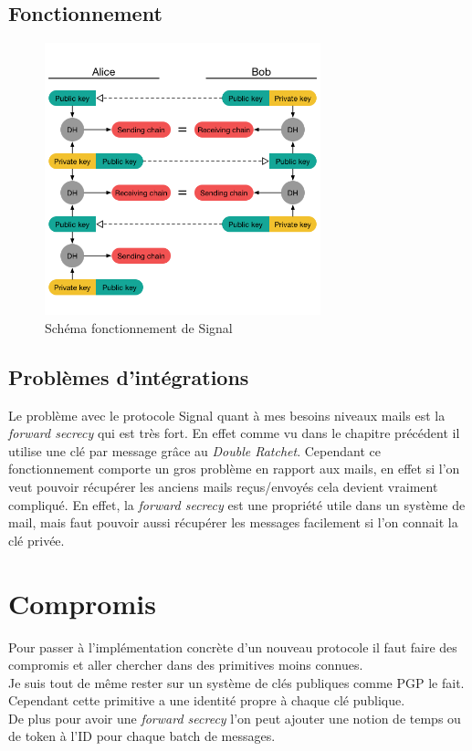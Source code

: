 \subsection{Fonctionnement}
\begin{figure}[h!]
	\centering
	\includegraphics[width=8cm]{images/signalFonctionnement.png}
	\caption{Schéma fonctionnement de Signal\cite{doubleratchet}}
	\label{fig:signal}
\end{figure}
\subsection{Problèmes d'intégrations}
Le problème avec le protocole Signal quant à mes besoins niveaux mails est la \textit{forward secrecy} qui est très fort. En effet comme vu dans le chapitre précédent il utilise une clé par message grâce au \textit{Double Ratchet}. Cependant ce fonctionnement comporte un gros problème en rapport aux mails, en effet si l'on veut pouvoir récupérer les anciens mails reçus/envoyés cela devient vraiment compliqué. En effet, la \textit{forward secrecy} est une propriété utile dans un système de mail, mais faut pouvoir aussi récupérer les messages facilement si l'on connait la clé privée.
\section{Compromis}
Pour passer à l'implémentation concrète d'un nouveau protocole il faut faire des compromis et aller chercher dans des primitives moins connues.\\
Je suis tout de même rester sur un système de clés publiques comme PGP le fait. Cependant cette primitive a une identité propre à chaque clé publique.\\
De plus pour avoir une \textit{forward secrecy} l'on peut ajouter une notion de temps ou de token à l'ID pour chaque batch de messages.

